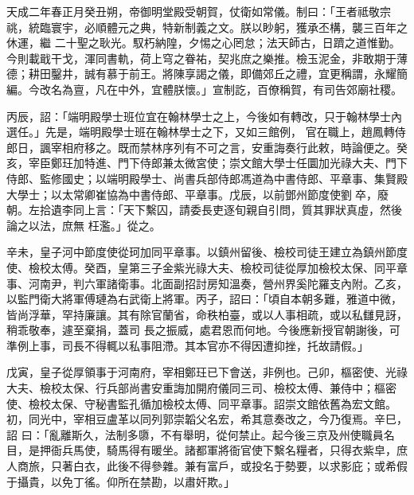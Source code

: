 
\begin{pinyinscope}

 天成二年春正月癸丑朔，帝御明堂殿受朝賀，仗衛如常儀。制曰：「王者祗敬宗祧，統臨寰宇，必順體元之典，特新制義之文。朕以眇躬，獲承丕構，襲三百年之休運，繼
 二十聖之耿光。馭朽納隍，夕惕之心罔怠；法天師古，日躋之道惟勤。今則載戢干戈，渾同書軌，荷上穹之眷祐，契兆庶之樂推。檢玉泥金，非敢期于薄德；耕田鑿井，誠有慕于前王。將陳享謁之儀，即備郊丘之禮，宜更稱謂，永耀簡編。今改名為亶，凡在中外，宜體朕懷。」宣制訖，百僚稱賀，有司告郊廟社稷。



 丙辰，詔：「端明殿學士班位宜在翰林學士之上，今後如有轉改，只于翰林學士內選任。」先是，端明殿學士班在翰林學士之下，又如三館例，
 官在職上，趙鳳轉侍郎日，諷宰相府移之。既而禁林序列有不可之言，安重誨奏行此敕，時論便之。癸亥，宰臣鄭玨加特進、門下侍郎兼太微宮使；崇文館大學士任圜加光祿大夫、門下侍郎、監修國史；以端明殿學士、尚書兵部侍郎馮道為中書侍郎、平章事、集賢殿大學士；以太常卿崔協為中書侍郎、平章事。戊辰，以前鄧州節度使劉卒，廢朝。左拾遺李同上言：「天下繫囚，請委長吏逐旬親自引問，質其罪狀真虛，然後論之以法，庶無
 枉濫。」從之。



 辛未，皇子河中節度使從珂加同平章事。以鎮州留後、檢校司徒王建立為鎮州節度使、檢校太傅。癸酉，皇第三子金紫光祿大夫、檢校司徒從厚加檢校太保、同平章事、河南尹，判六軍諸衛事。北面副招討房知溫奏，營州界奚陀羅支內附。乙亥，以監門衛大將軍傅璉為右武衛上將軍。丙子，詔曰：「頃自本朝多難，雅道中微，皆尚浮華，罕持廉讓。其有除官蘭省，命秩柏臺，或以人事相疏，或以私讎見訝，稍乖敬奉，遽至棄捐，蓋司
 長之振威，處君恩而何地。今後應新授官朝謝後，可準例上事，司長不得輒以私事阻滯。其本官亦不得因遭抑挫，托故請假。」



 戊寅，皇子從厚領事于河南府，宰相鄭玨已下會送，非例也。己卯，樞密使、光祿大夫、檢校太保、行兵部尚書安重誨加開府儀同三司、檢校太傅、兼侍中；樞密使、檢校太保、守秘書監孔循加檢校太傅、同平章事。詔崇文館依舊為宏文館。初，同光中，宰相豆盧革以同列郭崇韜父名宏，希其意奏改之，今乃復焉。辛巳，詔
 曰：「亂離斯久，法制多隳，不有舉明，從何禁止。起今後三京及州使職員名目，是押衙兵馬使，騎馬得有暖坐。諸都軍將衙官使下繫名糧者，只得衣紫皁，庶人商旅，只著白衣，此後不得參雜。兼有富戶，或投名于勢要，以求影庇；或希假于攝貴，以免丁徭。仰所在禁勘，以肅奸欺。」




\end{pinyinscope}
